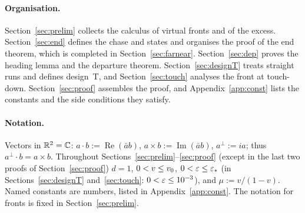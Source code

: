 \paragraph{Organisation.} Section~\ref{sec:prelim} collects the calculus of virtual fronts and of the excess. Section~\ref{sec:end}
defines the chase and states and organises the proof of the end theorem, which is completed in Section~\ref{sec:farnear}.
Section~\ref{sec:dep} proves the heading lemma and the departure theorem. Section~\ref{sec:designT} treats straight runs and
defines design~T, and Section~\ref{sec:touch} analyses the front at touch-down. Section~\ref{sec:proof} assembles the proof, and
Appendix~\ref{app:const} lists the constants and the side conditions they satisfy.

\paragraph{Notation.} Vectors in $\mathbb{R}^2=\mathbb{C}$: $a\cdot b:=\operatorname{Re}(\bar ab)$, $a\times b:=\operatorname{Im}(\bar ab)$,
$a^\perp:=ia$; thus $a^\perp\cdot b=a\times b$. Throughout Sections~\ref{sec:prelim}--\ref{sec:proof} (except in the last two proofs
of Section~\ref{sec:proof}) $d=1$, $0<v\le v_0$, $0<\varepsilon\le\varepsilon_*$ (in Sections~\ref{sec:designT} and~\ref{sec:touch}:
$0<\varepsilon\le10^{-3}$), and $\mu:=v/(1-v)$. Named constants are numbers, listed in Appendix~\ref{app:const}. The notation for fronts is
fixed in Section~\ref{sec:prelim}.

